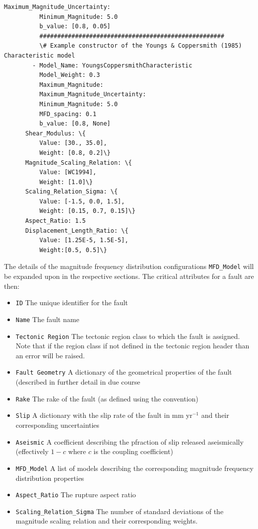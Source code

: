 \begin{Verbatim}[frame=single, commandchars=\\\{\}, fontsize=\scriptsize]
          Maximum_Magnitude_Uncertainty:
          Minimum_Magnitude: 5.0
          b_value: [0.8, 0.05]
          ####################################################
          \# Example constructor of the Youngs & Coppersmith (1985) Characteristic model
        - Model_Name: YoungsCoppersmithCharacteristic
          Model_Weight: 0.3
          Maximum_Magnitude:
          Maximum_Magnitude_Uncertainty:
          Minimum_Magnitude: 5.0
          MFD_spacing: 0.1
          b_value: [0.8, None]
      Shear_Modulus: \{
          Value: [30., 35.0],
          Weight: [0.8, 0.2]\}
      Magnitude_Scaling_Relation: \{
          Value: [WC1994],
          Weight: [1.0]\}
      Scaling_Relation_Sigma: \{
          Value: [-1.5, 0.0, 1.5],
          Weight: [0.15, 0.7, 0.15]\}
      Aspect_Ratio: 1.5
      Displacement_Length_Ratio: \{
          Value: [1.25E-5, 1.5E-5],
          Weight:[0.5, 0.5]\}
\end{Verbatim}

The details of the magnitude frequency distribution configurations \verb=MFD_Model= will be expanded upon in the respective sections. The critical attributes for a fault are then:

\begin{itemize}
\item \verb=ID= The unique identifier for the fault
\item \verb=Name= The fault name
\item \verb=Tectonic Region= The tectonic region class to which the fault is assigned. Note that if the region class if not defined in the tectonic region header than an error will be raised.
\item \verb=Fault Geometry= A dictionary of the geometrical properties of the fault (described in further detail in due course
\item \verb=Rake= The rake of the fault (as defined using the \textcite{aki2002} convention)
\item \verb=Slip= A dictionary with the slip rate of the fault in mm yr$^{-1}$ and their corresponding uncertainties
\item \verb=Aseismic= A coefficient describing the pfraction of slip released aseismically (effectively $1 - c$ where $c$ is the coupling coefficient)
\item \verb=MFD_Model= A list of models describing the corresponding magnitude frequency distribution properties
\item \verb=Aspect_Ratio= The rupture aspect ratio
\item \verb=Scaling_Relation_Sigma= The number of standard deviations of the magnitude scaling relation and their corresponding weights. 
\end{itemize}

